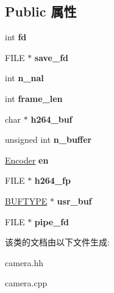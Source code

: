 \subsection*{Public 属性}
\begin{DoxyCompactItemize}
\item 
\mbox{\label{class_device_a471c31ce4b894f22afec70d1f1590782}} 
int {\bfseries fd}
\item 
\mbox{\label{class_device_a3d152911845541f5446ee80a495b6f7c}} 
F\+I\+LE $\ast$ {\bfseries save\+\_\+fd}
\item 
\mbox{\label{class_device_ab9d36e547656f839d6de58d7a32d2f3c}} 
int {\bfseries n\+\_\+nal}
\item 
\mbox{\label{class_device_a6feb7c01530f5a6da3591f879a288949}} 
int {\bfseries frame\+\_\+len}
\item 
\mbox{\label{class_device_ac869882992a1eacf0b20c2626fc50297}} 
char $\ast$ {\bfseries h264\+\_\+buf}
\item 
\mbox{\label{class_device_a38e039235792703a1d8dfc55856c89fd}} 
unsigned int {\bfseries n\+\_\+buffer}
\item 
\mbox{\label{class_device_aaa76044ff91ebd8322df4050c782b8cb}} 
\hyperlink{struct_encoder}{Encoder} {\bfseries en}
\item 
\mbox{\label{class_device_afb3ee5767b665069c4d092f958c5895a}} 
F\+I\+LE $\ast$ {\bfseries h264\+\_\+fp}
\item 
\mbox{\label{class_device_a57193e929419148917d556eb6c7a912e}} 
\hyperlink{struct_b_u_f_t_y_p_e}{B\+U\+F\+T\+Y\+PE} $\ast$ {\bfseries usr\+\_\+buf}
\item 
\mbox{\label{class_device_ad09954e6b78dabb3948a4fa9e5d08dfc}} 
F\+I\+LE $\ast$ {\bfseries pipe\+\_\+fd}
\end{DoxyCompactItemize}


该类的文档由以下文件生成\+:\begin{DoxyCompactItemize}
\item 
camera.\+hh\item 
camera.\+cpp\end{DoxyCompactItemize}
